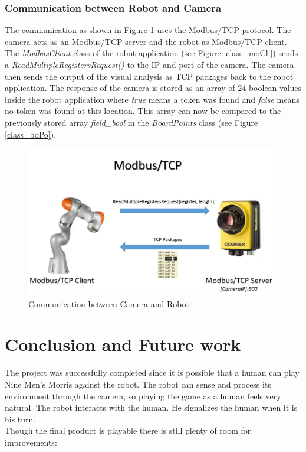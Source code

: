 \documentclass[a4paper]{spie}  %
\begin{document}
\begin{large}
\subsubsection{Communication between Robot and Camera}
\label{commu}
The communication as shown in Figure \ref{communication} uses the Modbus/TCP protocol. The camera acts as an Modbus/TCP server and the robot as Modbus/TCP client. The \emph{ModbusClient} class of the robot application (see Figure \ref{class_moCli})  sends a \emph{ReadMultipleRegistersRequest()} to the IP and port of the camera. The camera then sends the output of the visual analysis as TCP packages back to the robot application. The response of the camera is stored as an array of 24 boolean values inside the robot application where \emph{true} means a token was found and \emph{false} means no token was found at this location. This array can now be compared to the previously stored array \emph{field\_bool} in the \emph{BoardPoints} class (see Figure \ref{class_boPo}).
\begin{figure}[h]
\includegraphics[width=15cm]{images/communication.png}
\centering
\caption{Communication between Camera and Robot}
\label{communication}
\end{figure}

\newpage
\section{Conclusion and Future work}
The project was successfully completed since it is possible that a human can play Nine Men's Morris against the robot. The robot can sense and process its environment through the camera, so playing the game as a human feels very natural. The robot interacts with the human. He signalizes the human when it is his turn. \\ 
Though the final product is playable there is still plenty of room for improvements:

\end{large}
\end{document}

